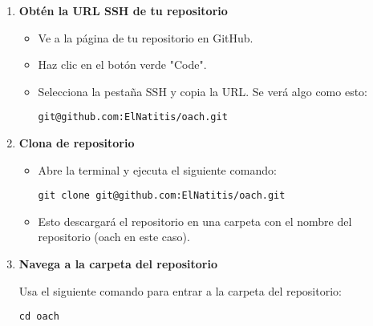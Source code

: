 \documentclass[10pt,a4paper]{book}
\begin{document}
\begin{enumerate}
	\item \textbf{Obtén la URL SSH de tu repositorio}
	\begin{itemize}
		\item Ve a la página de tu repositorio en GitHub.

		\item Haz clic en el botón verde "Code".

		\item Selecciona la pestaña SSH y copia la URL. Se verá algo como esto:
		\begin{lstlisting}
git@github.com:ElNatitis/oach.git
		\end{lstlisting}
	\end{itemize}
	\item \textbf{Clona de repositorio}
	\begin{itemize}
		\item Abre la terminal y ejecuta el siguiente comando:
		\begin{lstlisting}
git clone git@github.com:ElNatitis/oach.git
		\end{lstlisting}
		\item Esto descargará el repositorio en una carpeta con el nombre del repositorio (oach en este caso).
	\end{itemize}
	\item \textbf{Navega a la carpeta del repositorio}
	\begin{itemize}
		Usa el siguiente comando para entrar a la carpeta del repositorio:
		\begin{lstlisting}
cd oach
		\end{lstlisting}
	\end{itemize}
\end{enumerate}
\end{document}
